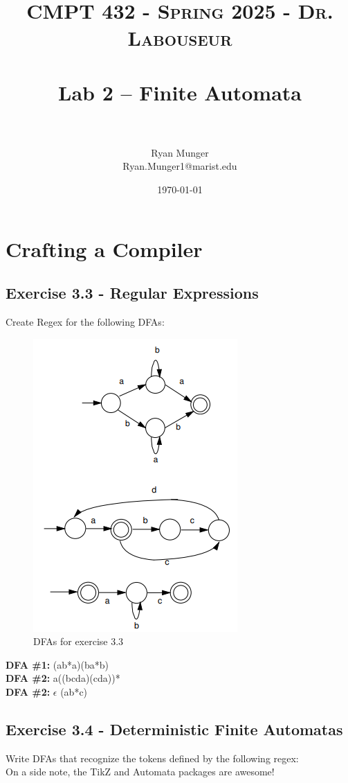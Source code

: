 \documentclass[letterpaper, 10pt]{article}
\title{	
   \normalfont \normalsize 
   \textsc{CMPT 432 - Spring 2025 - Dr. Labouseur} \\[10pt] %
   \horrule{0.5pt} \\[0.25cm] 	%
   \huge Lab 2 -- Finite Automata \\     	    %
   \horrule{0.5pt} \\[0.25cm] 	%
}
\author{Ryan Munger \\ \normalsize Ryan.Munger1@marist.edu}
\date{\normalsize\today} 	%
\begin{document}
\maketitle %


\section{Crafting a Compiler}
\subsection{Exercise 3.3 - Regular Expressions}
Create Regex for the following DFAs:
\begin{figure}[H]
    \centering
    \includegraphics[width=.4\linewidth]{exercise3-3.png}
    \caption{DFAs for exercise 3.3}
    \label{fig:enter-label}
\end{figure}
\newpage
\noindent
\textbf{DFA \#1:} (ab*a)\textbar(ba*b) \\
\textbf{DFA \#2:} a((bcda)\textbar(cda))* \\
\textbf{DFA \#2:} $\epsilon$ \textbar (ab*c)  \\

\subsection{Exercise 3.4 - Deterministic Finite Automatas}
Write DFAs that recognize the tokens defined by the following regex: \\
On a side note, the TikZ and Automata packages are awesome! \\
\end{document}
